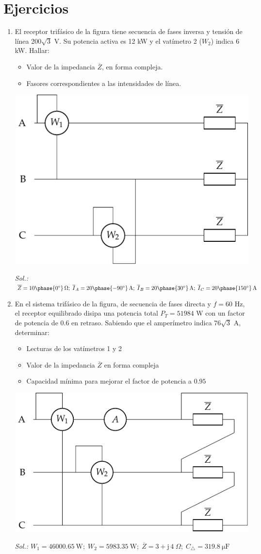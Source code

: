 \section*{Ejercicios}
\begin{enumerate}

\item El receptor trifásico de la figura tiene secuencia de fases
  inversa y tensión de línea 200$\sqrt{3}$ V. Su potencia activa es 12
  kW y el vatímetro 2 ($W_2$) indica 6 kW. Hallar:
  \begin{itemize}
  \item Valor de la impedancia $\overline{Z}$, en forma compleja.
  \item Fasores correspondientes a las intensidades de línea.
  \end{itemize}

\begin{center}
  \includegraphics[width=0.5\linewidth]{../figs/ej6_BT3.pdf}
\end{center}

\emph{Sol.:\;
  $\overline{Z}=10\phase{0^\circ}\,\Omega;\;
  \overline{I}_A={20\phase{-90^\circ}\,\mathrm{A}};\;
  \overline{I}_B={20\phase{30^\circ}\,\mathrm{A}};\;
  \overline{I}_C={20\phase{150^\circ}\,\mathrm{A}}$}


\item En el sistema trifásico de la figura, de secuencia de fases
  directa y $f=60$ Hz, el receptor equilibrado disipa una potencia
  total $P_T =51984$ W con un factor de potencia de $0.6$ en
  retraso. Sabiendo que el amperímetro indica 76$\sqrt{3}$ A,
  determinar:
  \begin{itemize}
  \item Lecturas de los vatímetros 1 y 2
  \item Valor de la impedancia $\overline{Z}$ en forma compleja
  \item Capacidad mínima para mejorar el factor de potencia a $0.95$
  \end{itemize}
  \begin{center}
    \includegraphics[width=0.54\linewidth]{../figs/ej4_BT3.pdf}
  \end{center}
  \emph{Sol.:\;
    $ W_1=\qty{46000.65}{\watt};\; W_2=\qty{5983.35}{\watt};\;
    \overline{Z}=3+\mathrm{j}\,4\;\Omega;\; C_{\triangle}=\qty{319.8}{\micro\farad}$}


\end{enumerate}
